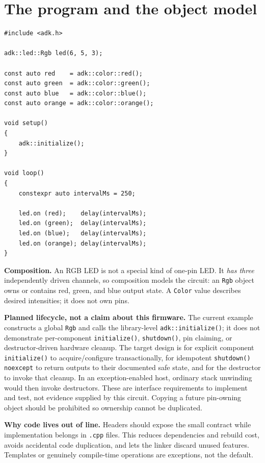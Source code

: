 \documentclass[11pt]{article}
\begin{document}
\section*{The program and the object model}
\begin{lstlisting}
#include <adk.h>

adk::led::Rgb led(6, 5, 3);

const auto red    = adk::color::red();
const auto green  = adk::color::green();
const auto blue   = adk::color::blue();
const auto orange = adk::color::orange();

void setup()
{
    adk::initialize();
}

void loop()
{
    constexpr auto intervalMs = 250;

    led.on (red);    delay(intervalMs);
    led.on (green);  delay(intervalMs);
    led.on (blue);   delay(intervalMs);
    led.on (orange); delay(intervalMs);
}
\end{lstlisting}

\textbf{Composition.} An RGB LED is not a special kind of one-pin LED. It
\emph{has three} independently driven channels, so composition models the circuit:
an \texttt{Rgb} object owns or contains red, green, and blue output state. A
\texttt{Color} value describes desired intensities; it does not own pins.

\textbf{Planned lifecycle, not a claim about this firmware.} The current example
constructs a global \texttt{Rgb} and calls the library-level
\texttt{adk::initialize()}; it does not demonstrate per-component
\texttt{initialize()}, \texttt{shutdown()}, pin claiming, or destructor-driven
hardware cleanup. The target design is for explicit component
\texttt{initialize()} to acquire/configure transactionally, for idempotent
\texttt{shutdown() noexcept} to return outputs to their documented safe state, and
for the destructor to invoke that cleanup. In an exception-enabled host, ordinary
stack unwinding would then invoke destructors. These are interface requirements to
implement and test, not evidence supplied by this circuit. Copying a future
pin-owning object should be prohibited so ownership cannot be duplicated.

\textbf{Why code lives out of line.} Headers should expose the small contract while
implementation belongs in \texttt{.cpp} files. This reduces dependencies and rebuild
cost, avoids accidental code duplication, and lets the linker discard unused
features. Templates or genuinely compile-time operations are exceptions, not the
default.
\end{document}
